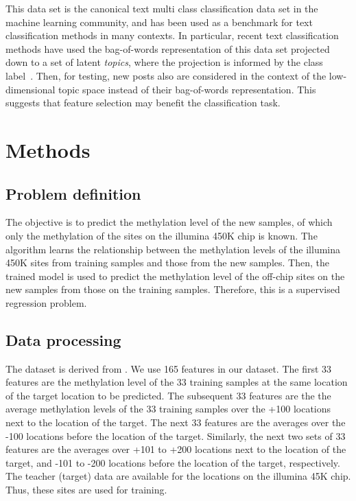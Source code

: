 \documentclass{article} %
\begin{document}
This data set is the canonical text multi class classification data set in the machine learning community, and has been used as a benchmark for text classification methods in many contexts. In particular, recent text classification methods have used the bag-of-words representation of this data set projected down to a set of latent \emph{topics}, where the projection is informed by the class label~\cite{zhu2009,lacoste2009}. Then, for testing, new posts also are considered in the context of the low-dimensional topic space instead of their bag-of-words representation. This suggests that feature selection may benefit the classification task.



\section{Methods}


\subsection{Problem definition}

The objective is to predict the methylation level of the new samples,
of which only the methylation of the sites on the illumina 450K chip
is known. The algorithm learns the relationship between the methylation
levels of the illumina 450K sites from training samples and those
from the new samples. Then, the trained model is used to predict the
methylation level of the off-chip sites on the new samples from those
on the training samples. Therefore, this is a supervised regression
problem. 


\subsection{Data processing}

The dataset is derived from \cite{ziller2013charting}. We use 165
features in our dataset. The first 33 features are the methylation
level of the 33 training samples at the same location of the target
location to be predicted. The subsequent 33 features are the the average
methylation levels of the 33 training samples over the +100 locations
next to the location of the target. The next 33 features are the averages
over the -100 locations before the location of the target. Similarly,
the next two sets of 33 features are the averages over +101 to +200
locations next to the location of the target, and -101 to -200 locations
before the location of the target, respectively. The teacher (target)
data are available for the locations on the illumina 45K chip. Thus,
these sites are used for training.
\end{document}
